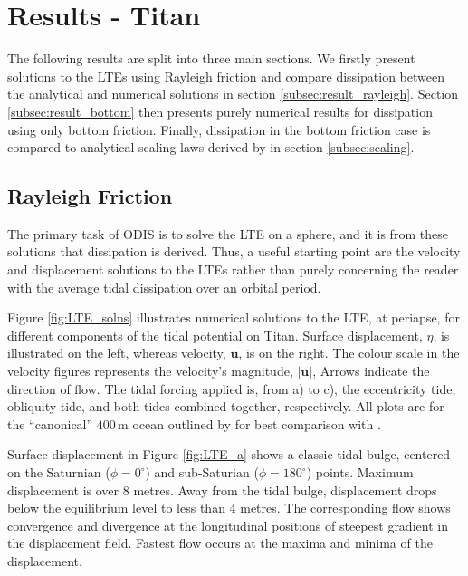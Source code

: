 \section{Results - Titan \label{sec:results}}

The following results are split into three main sections. We firstly present solutions to the LTEs using Rayleigh friction and compare dissipation between the analytical and numerical solutions in section \ref{subsec:result_rayleigh}. Section \ref{subsec:result_bottom} then presents purely numerical results for dissipation using only bottom friction. Finally, dissipation in the bottom friction case is compared to analytical scaling laws derived by \citet{chen2013tidal} in section \ref{subsec:scaling}.

\subsection{Rayleigh Friction \label{subsec:result_rayleigh}}

The primary task of ODIS is to solve the LTE on a sphere, and it is from these solutions that dissipation is derived. Thus, a useful starting point are the velocity and displacement solutions to the LTEs rather than purely concerning the reader with the average tidal dissipation over an orbital period. 

Figure \ref{fig:LTE_solns} illustrates numerical solutions to the LTE, at periapse, for different components of the tidal potential on Titan. Surface displacement, $\eta$, is illustrated on the left, whereas velocity, $\bm{u}$, is on the right. The colour scale in the velocity figures represents the velocity's magnitude, $\left| \bm{u} \right|$, Arrows indicate the direction of flow. The tidal forcing applied is, from a) to c), the eccentricity tide, obliquity tide, and both tides combined together, respectively. All plots are for the ``canonical'' $400 \, \si{\metre}$ ocean outlined by \citet{sagan1982tide} for best comparison with \citet{sears1994tidal,sears1995tidal,sohl1995tidal}.

Surface displacement in Figure \ref{fig:LTE_a} shows a classic tidal bulge, centered on the Saturnian ($\phi = 0^{\circ}$) and sub-Saturian ($\phi = 180^{\circ}$) points. Maximum displacement is over $8$ metres. Away from the tidal bulge, displacement drops below the equilibrium level to less than $4$ metres. The corresponding flow shows convergence and divergence at the longitudinal positions of steepest gradient in the displacement field. Fastest flow occurs at the maxima and minima of the displacement.

